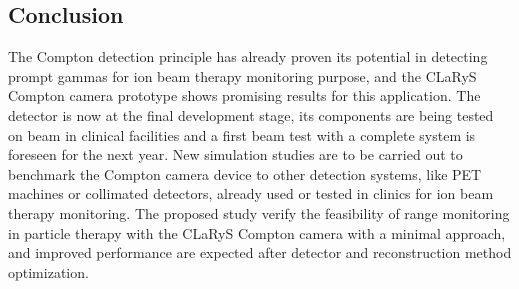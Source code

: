 \subsection{Conclusion}
The Compton detection principle has already proven its potential in detecting prompt gammas for ion beam therapy monitoring purpose, and the CLaRyS Compton camera prototype shows promising results for this application. The detector is now at the final development stage, its components are being tested on beam in clinical facilities and a first beam test with a complete system is foreseen for the next year. New simulation studies are to be carried out to benchmark the Compton camera device to other detection systems, like PET machines or collimated detectors, already used or tested in clinics for ion beam therapy monitoring. The proposed study verify the feasibility of range monitoring in particle therapy with the CLaRyS Compton camera with a minimal approach, and improved performance are expected after detector and reconstruction method optimization.           


